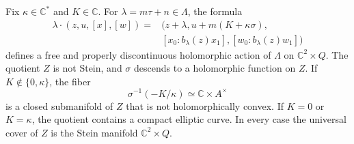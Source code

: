 \begin{proposition}\label{prop:elliptic-affine-quotient-nonstein}
Fix $\kappa\in\mathbb C^*$ and $K\in\mathbb C$. For $\lambda=m\tau+n\in\Lambda$, the formula
\[
 \begin{aligned}
 \lambda\cdot(z,u,[x],[w])={}&
 \bigl(z+\lambda,u+m(K+\kappa\sigma),\\
       &[x_0:b_\lambda(z)x_1],[w_0:b_\lambda(z)w_1]\bigr)
 \end{aligned}
\]
defines a free and properly discontinuous holomorphic action of $\Lambda$ on $\mathbb C^2\times Q$. The quotient $Z$ is not Stein, and $\sigma$ descends to a holomorphic function on $Z$. If $K\notin\{0,\kappa\}$, the fiber
\[
 \sigma^{-1}(-K/\kappa)\simeq\mathbb C\times A^\times
\]
is a closed submanifold of $Z$ that is not holomorphically convex. If $K=0$ or $K=\kappa$, the quotient contains a compact elliptic curve. In every case the universal cover of $Z$ is the Stein manifold $\mathbb C^2\times Q$.
\end{proposition}
